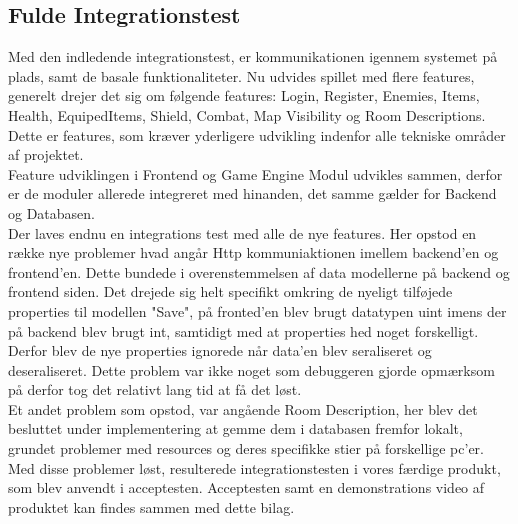 
\subsection{Fulde Integrationstest}

Med den indledende integrationstest, er kommunikationen igennem systemet på plads, samt de basale funktionaliteter. Nu udvides spillet med flere features, generelt drejer det sig om følgende features: Login, Register, Enemies, Items, Health, EquipedItems, Shield, Combat, Map Visibility og Room Descriptions. Dette er features, som kræver yderligere udvikling indenfor alle tekniske områder af projektet.\\


Feature udviklingen i Frontend og Game Engine Modul udvikles sammen, derfor er de moduler allerede integreret med hinanden, det samme gælder for Backend og Databasen.\\

Der laves endnu en integrations test med alle de nye features. Her opstod en række nye problemer hvad angår Http kommuniaktionen imellem backend'en og frontend'en. Dette bundede i overenstemmelsen af data modellerne på backend og frontend siden. Det drejede sig helt specifikt omkring de nyeligt tilføjede properties til modellen "Save", på fronted'en blev brugt datatypen uint imens der på backend blev brugt int, samtidigt med at properties hed noget forskelligt. Derfor blev de nye properties ignorede når data'en blev seraliseret og deseraliseret. Dette problem var ikke noget som debuggeren gjorde opmærksom på derfor tog det relativt lang tid at få det løst.\\

Et andet problem som opstod, var angående Room Description, her blev det besluttet under implementering at gemme dem i databasen fremfor lokalt, grundet problemer med resources og deres specifikke stier på forskellige pc'er.\\

Med disse problemer løst, resulterede integrationstesten i vores færdige produkt, som blev anvendt i acceptesten. Acceptesten samt en demonstrations video af produktet kan findes sammen med dette bilag.\\

  

